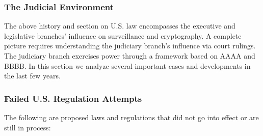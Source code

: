 
\lawsend

\subsubsection{The Judicial Environment}
\label{sec-us-judicial}

The above history and section on U.S. law encompasses the executive and legislative branches' influence on surveillance
and cryptography. A complete picture requires understanding the judiciary branch's influence via court rulings. The
judiciary branch exercises power through a framework based on AAAA and BBBB. In this section we analyze several
important cases and developments in the last few years.




\subsubsection{Failed U.S. Regulation Attempts}
\label{sec-us-reg-fails}

The following are proposed laws and regulations that did not go into effect or are still in process:


\lawsstart


